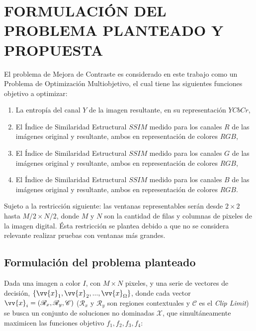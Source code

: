 \chapter{FORMULACIÓN DEL PROBLEMA PLANTEADO Y PROPUESTA}
\label{sec:proposal}

El problema de Mejora de Contraste es considerado en este trabajo como un Problema de Optimización Multiobjetivo, el cual tiene las siguientes funciones objetivo a optimizar:

\begin{enumerate}
\item La entropía del canal $Y$ de la imagen resultante, en su representación $YCbCr$,
\item El Índice de Similaridad Estructural $SSIM$ medido para los canales $R$ de las imágenes original y resultante, ambos en representación de colores $RGB$,
\item El Índice de Similaridad Estructural $SSIM$ medido para los canales $G$ de las imágenes original y resultante, ambos en representación de colores $RGB$,
\item El Índice de Similaridad Estructural $SSIM$ medido para los canales $B$ de las imágenes original y resultante, ambos en representación de colores $RGB$.
\end{enumerate}

Sujeto a la restricción siguiente: las ventanas representables serán desde $2 \times 2$ hasta $M/2 \times N/2$, donde $M$ y $N$ son la cantidad de filas y columnas de pixeles de la imagen digital. Ésta restricción se plantea debido a que no se considera relevante realizar pruebas con ventanas más grandes.

\section{Formulación del problema planteado}\label{sec:formulation}

Dada una imagen a color $I$\label{symbol:ioriginal}, con $M \times N$ pixeles, y una serie de vectores de decisión, $\{\vv{x}_1, \vv{x}_2,...,\vv{x}_{\Omega}\}$, donde cada vector $\vv{x}_i=(\mathscr{R}_x,\mathscr{R}_y,\mathscr{C})$ ($\mathscr{R}_x$\label{symbol:claheventanax} y $\mathscr{R}_y$\label{symbol:claheventanay} son regiones contextuales y $\mathscr{C}$ es el \textit{Clip Limit}) se busca un conjunto de soluciones no dominadas $\mathscr{X}$, que simultáneamente maximicen las funciones objetivo $f_1,f_2,f_3,f_4$:

